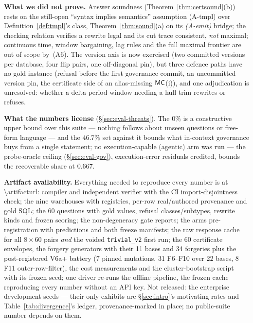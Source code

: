 \smallskip\noindent{}\textbf{What we did not prove.} Answer soundness
(Theorem~\ref{thm:certsound}(b)) rests on the still-open ``syntax
implies semantics'' assumption (A-tmpl) over Definition~\ref{def:tmpl}'s
class, Theorem~\ref{thm:sound}(a) on its \emph{(A-emit)} bridge; the
checking relation verifies a rewrite legal and
its cut trace consistent, \emph{not} maximal; continuous time,
window bargaining, lag rules and the full maximal frontier are out of
scope by~(A6). The version axis is now exercised (two committed versions per
database, four flip pairs, one off-diagonal pin), but three defence paths
have no gold instance (refusal before the first
governance commit, an uncommitted version pin, the certificate side of an
alias-missing $\mathsf{MC}$(i)), and one adjudication is unresolved: whether a
delta-period window needing a hull trim rewrites or refuses.

\smallskip\noindent{}\textbf{What the numbers license} (\S\ref{sec:eval-threats}).
The $0\%$ is a constructive upper bound over this suite --- nothing
follows about unseen questions or free-form language --- and the $46.7\%$
set against it bounds what in-context governance buys from a single
statement; no execution-capable (agentic) arm was run --- the probe-oracle
ceiling (\S\ref{sec:eval-gov}), execution-error residuals credited,
bounds the recoverable share at $0.667$.

\smallskip\noindent{}\textbf{Artifact availability.} Everything needed to
reproduce every number is at
\url{\artifacturl}: compiler and
independent verifier with the CI import-disjointness check; the nine
warehouses with registries, per-row real/authored provenance and gold SQL;
the 60 questions with gold values, refusal classes/subtypes, rewrite kinds
and frozen scoring; the non-degeneracy gate reports; the arms
pre-registration with predictions and both freeze manifests; the raw response cache for all $8\times60$ pairs \emph{and} the voided
\texttt{trivial\_v2} first run; the 60 certificate envelopes, the forgery
generators with their 11 bases and 34 forgeries plus the post-registered
V6a+ battery (7 pinned mutations, 31 F6--F10 over 22
bases, 8 F11 outer-row-filter), the cost measurements and the
cluster-bootstrap script with its frozen seed; one driver re-runs the
offline pipeline, the frozen cache reproducing every number without an
API key. Not released: the enterprise development seeds --- their only
exhibits are \S\ref{sec:intro}'s motivating rates and
Table~\ref{tab:divergence}'s ledger, provenance-marked in place; no
public-suite number depends on them.

